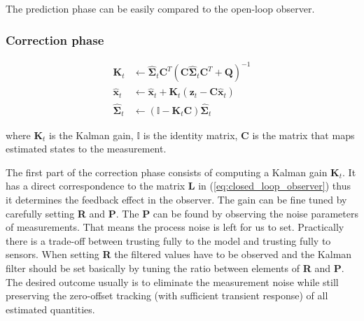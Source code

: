 The prediction phase can be easily compared to the open-loop observer. 

\subsubsection*{Correction phase}

\begin{equation}
\begin{split}
\textbf{K}_t &\leftarrow \hat{\boldsymbol{\Sigma}}_t\textbf{C}^{T}\left(\textbf{C}\hat{\boldsymbol{\Sigma}}_t\textbf{C}^{T} + \textbf{Q}\right)^{-1} \\
\hat{\textbf{x}}_t &\leftarrow \hat{\textbf{x}}_t + \textbf{K}_t\left(\textbf{z}_t - \textbf{C}\hat{\textbf{x}}_t\right) \\
\hat{\boldsymbol{\Sigma}}_t &\leftarrow \left(\mathbb{I} - \textbf{K}_t\textbf{C}\right)\hat{\boldsymbol{\Sigma}}_t
\end{split}
\end{equation}

where $\textbf{K}_t$ is the Kalman gain, $\mathbb{I}$ is the identity matrix, \textbf{C} is the matrix that maps estimated states to the measurement.

The first part of the correction phase consists of computing a Kalman gain $\textbf{K}_t$. It has a direct correspondence to the matrix \textbf{L} in (\ref{eq:closed_loop_observer}) thus it determines the feedback effect in the observer. The gain can be fine tuned by carefully setting \textbf{R} and \textbf{P}. The \textbf{P} can be found by observing the noise parameters of measurements. That means the process noise is left for us to set. Practically there is a trade-off between trusting fully to the model and trusting fully to sensors. When setting \textbf{R} the filtered values have to be observed and the Kalman filter should be set basically by tuning the ratio between elements of \textbf{R} and \textbf{P}. The desired outcome usually is to eliminate the measurement noise while still preserving the zero-offset tracking (with sufficient transient response) of all estimated quantities.
